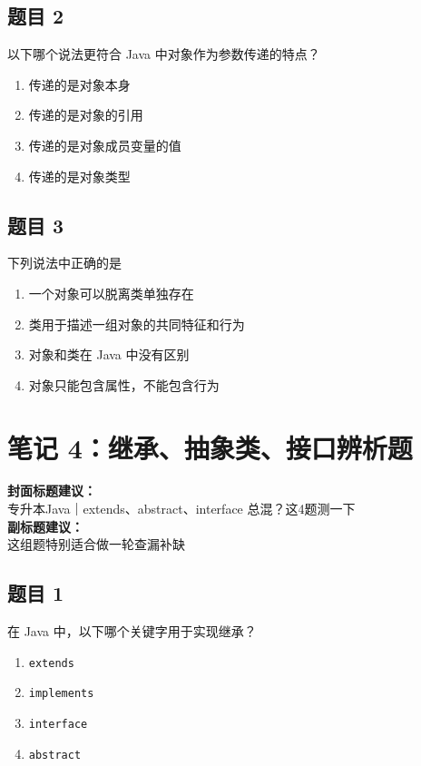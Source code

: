 \documentclass[12pt,a4paper]{ctexart}
\begin{document}
\subsection*{题目 2}
以下哪个说法更符合 Java 中对象作为参数传递的特点？
\begin{enumerate}[label=\Alph*.]
    \item 传递的是对象本身
    \item 传递的是对象的引用
    \item 传递的是对象成员变量的值
    \item 传递的是对象类型
\end{enumerate}

\subsection*{题目 3}
下列说法中正确的是
\begin{enumerate}[label=\Alph*.]
    \item 一个对象可以脱离类单独存在
    \item 类用于描述一组对象的共同特征和行为
    \item 对象和类在 Java 中没有区别
    \item 对象只能包含属性，不能包含行为
\end{enumerate}

\newpage

\section{笔记 4：继承、抽象类、接口辨析题}
\begin{coverbox}
\textbf{封面标题建议：}\\
专升本Java｜extends、abstract、interface 总混？这4题测一下\\
\textbf{副标题建议：}\\
这组题特别适合做一轮查漏补缺
\end{coverbox}

\subsection*{题目 1}
在 Java 中，以下哪个关键字用于实现继承？
\begin{enumerate}[label=\Alph*.]
    \item \texttt{extends}
    \item \texttt{implements}
    \item \texttt{interface}
    \item \texttt{abstract}
\end{enumerate}
\end{document}
